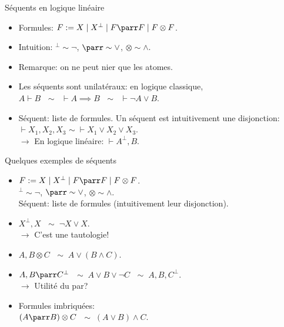 \documentclass{beamer}
\newcommand*{\orth}{^\perp}
\newcommand*{\tensor}{\otimes}
\begin{document}
\begin{frame}{Séquents en logique linéaire}
    \begin{itemize}
        \item Formules: \pause $F := X \mid X\orth \mid F \parr F \mid F \tensor F$.
            \pause
        \item Intuition: \pause $\orth \sim \neg$\pause, $\parr \sim \lor$\pause, $\tensor \sim \land$.
            \pause
        \item Remarque: \pause on ne peut nier que les atomes.
            \pause \\ 
        \item Les séquents sont unilatéraux: \pause en logique classique, \\ $A \vdash B$ \pause $\; \sim \; \; \vdash A \implies B$ \pause $\; \sim \; \; \vdash \neg A \lor B$.\\         \pause
        \item Séquent: \pause liste de formules. \pause Un séquent est intuitivement une disjonction\pause: $\vdash X_1, X_2, X_3$ \pause $\sim \; \vdash X_1 \lor X_2 \lor X_3$. 
        \pause\\
        $\rightarrow$ En logique linéaire: \pause $\vdash A\orth{}, B$.
    \end{itemize}
\end{frame}

\begin{frame}{Quelques exemples de séquents}
    \begin{itemize}
        \item $F := X \mid X\orth \mid F \parr F \mid F \tensor F$.\\
        $\orth \sim \neg$, $\parr \sim \lor$, $\tensor \sim \land$.\\
        Séquent: liste de formules (intuitivement leur disjonction).
            \pause
        \item $X\orth{}, X$ \pause $\; \sim \; \neg X \lor X$. \\
        \pause $\rightarrow$ C'est une tautologie!
            \pause
        \item $A, B \tensor C$ \pause $\; \sim \; A \lor (B \land C)$.
            \pause
        \item $A,B \parr C\orth{}$ \pause $\; \sim \; A \lor B \lor \neg C$ \pause $\; \sim \; A, B, C\orth{}$. \\
        \pause $\rightarrow$ Utilité du par?
            \pause
        \item Formules imbriquées:\\
        \pause $(A \parr B) \tensor C$ \pause $\; \sim \; (A \lor B) \land C$.
    \end{itemize}
\end{frame}
\end{document}
